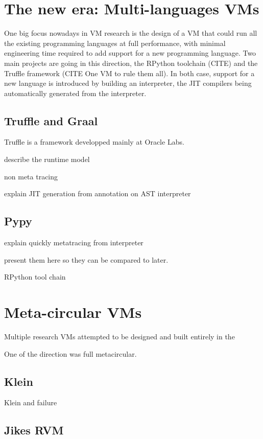 \documentclass[a4paper,12pt,twoside]{../includes/ThesisStyle}
\begin{document}
\section{The new era: Multi-languages VMs}

One big focus nowadays in VM research is the design of a VM that could run all the existing programming languages at full performance, with minimal engineering time required to add support for a new programming language. Two main projects are going in this direction, the RPython toolchain (CITE) and the Truffle framework (CITE One VM to rule them all). In both case, support for a new language is introduced by building an interpreter, the JIT compilers being automatically generated from the interpreter.

\subsection{Truffle and Graal}

Truffle is a framework developped mainly at Oracle Labs. 

describe the runtime model

non meta tracing

explain JIT generation from annotation on AST interpreter

\subsection{Pypy}

explain quickly metatracing from interpreter

present them here so they can be compared to later.

RPython tool chain \cite{Rigo06a}

\section{Meta-circular VMs}

Multiple research VMs attempted to be designed and built entirely in the 

One of the direction was full metacircular.

\subsection{Klein}

Klein and failure ~\cite{Unga05b}

\subsection{Jikes RVM}
\end{document}
